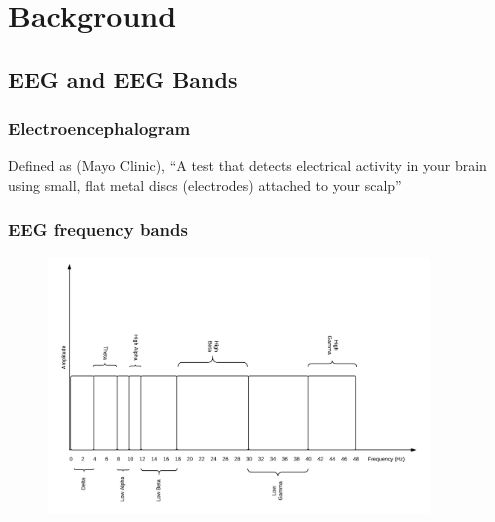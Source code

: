 \documentclass[unknownkeysallowed]{beamer}
\begin{document}
\section{Background}

\subsection{EEG and EEG Bands}
\begin{frame}
  \frametitle{Electroencephalogram}
   Defined as (Mayo Clinic), ``A test that detects electrical activity in your brain using small, flat metal discs (electrodes) attached to your scalp''
  \begin{figure}[hbtp]
    	 \hspace{2cm}
    	
    	\label{eeg_sensors}
    \end{figure}
\end{frame}

\begin{frame}
  \frametitle{EEG frequency bands}
    \begin{figure}[hbtp]
    	\centering
    	\includegraphics[width=0.9\textwidth]{EEG_bands}   	
    	\label{eeg_bands}
    \end{figure}  
\end{frame}
\end{document}
